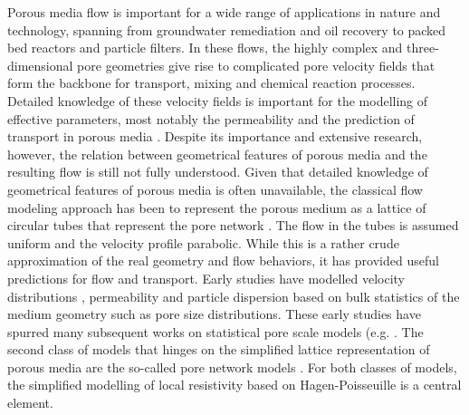 \documentclass[draft]{agujournal2019}
\begin{document}
Porous media flow is important for a wide range of applications in nature and technology, spanning from groundwater remediation and oil recovery to packed bed reactors and particle filters. In these flows, the highly complex and three-dimensional pore geometries give rise to complicated pore velocity fields that form the backbone for transport, mixing and chemical reaction processes. Detailed knowledge of these velocity fields is important for the modelling of effective parameters, most notably the permeability and the prediction of transport in porous media \cite{bear_dynamics_1972,scheidegger_physics_1974}. Despite its importance and extensive research, however, the relation between geometrical features of porous media and the resulting flow is still not fully understood.
Given that detailed knowledge of geometrical features of porous media is often unavailable, the classical flow modeling approach has been to represent the porous medium as a lattice of circular tubes that represent the pore network \cite{scheidegger_physics_1974}. The flow in the tubes is assumed uniform and the velocity profile parabolic. While this is a rather crude approximation of the real geometry and flow behaviors, it has provided useful predictions for flow and transport. Early studies have modelled velocity distributions \cite{haring_statistical_1970}, permeability \cite{fatt_network_1956,katz_quantitative_1986} and particle dispersion \cite{saffman_theory_1959} based on bulk statistics of the medium geometry such as pore size distributions. These early studies have spurred many subsequent works on statistical pore scale models (e.g. \cite{dullien_single_1975,kutsovsky_nmr_1996,maier_simulation_1999,siena_relationship_2014,de_anna_prediction_2017}. The second class of models that hinges on the simplified lattice representation of porous media are the so-called pore network models \cite{thompson_modeling_1997}. For both classes of models, the simplified modelling of local resistivity based on Hagen-Poisseuille is a central element.
\end{document}
